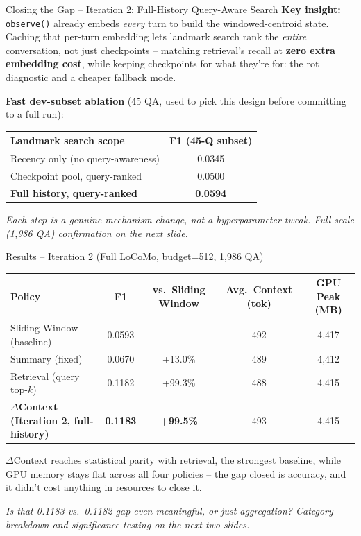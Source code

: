 \documentclass[aspectratio=169]{beamer}
\begin{document}
\begin{frame}{Closing the Gap -- Iteration 2: Full-History Query-Aware Search}
    \textbf{Key insight:} \texttt{observe()} already embeds \emph{every} turn to build the windowed-centroid state. Caching that per-turn embedding lets landmark search rank the \emph{entire} conversation, not just checkpoints -- matching retrieval's recall at \textbf{zero extra embedding cost}, while keeping checkpoints for what they're for: the rot diagnostic and a cheaper fallback mode.

    \vspace{0.2cm}
    \textbf{Fast dev-subset ablation} (45 QA, used to pick this design before committing to a full run):
    \begin{table}
    \centering
    \begin{tabular}{lc}
    \toprule
    Landmark search scope & F1 (45-Q subset) \\
    \midrule
    Recency only (no query-awareness) & 0.0345 \\
    Checkpoint pool, query-ranked & 0.0500 \\
    \textbf{Full history, query-ranked} & \textbf{0.0594} \\
    \bottomrule
    \end{tabular}
    \end{table}

    \vspace{0.2cm}
    \textit{Each step is a genuine mechanism change, not a hyperparameter tweak. Full-scale (1{,}986 QA) confirmation on the next slide.}
\end{frame}

\begin{frame}{Results -- Iteration 2 (Full LoCoMo, budget=512, 1{,}986 QA)}
    \begin{table}
    \centering
    \begin{tabular}{lcccc}
    \toprule
    Policy & F1 & vs.\ Sliding Window & Avg.\ Context (tok) & GPU Peak (MB) \\
    \midrule
    Sliding Window (baseline) & 0.0593 & -- & 492 & 4{,}417 \\
    Summary (fixed) & 0.0670 & +13.0\% & 489 & 4{,}412 \\
    Retrieval (query top-$k$) & 0.1182 & +99.3\% & 488 & 4{,}415 \\
    \textbf{$\Delta$Context (Iteration 2, full-history)} & \textbf{0.1183} & \textbf{+99.5\%} & 493 & 4{,}415 \\
    \bottomrule
    \end{tabular}
    \end{table}

    \vspace{0.4cm}
    $\Delta$Context reaches statistical parity with retrieval, the strongest baseline, while GPU memory stays flat across all four policies -- the gap closed is accuracy, and it didn't cost anything in resources to close it.

    \vspace{0.3cm}
    \textit{Is that 0.1183 vs.\ 0.1182 gap even meaningful, or just aggregation? Category breakdown and significance testing on the next two slides.}
\end{frame}
\end{document}
